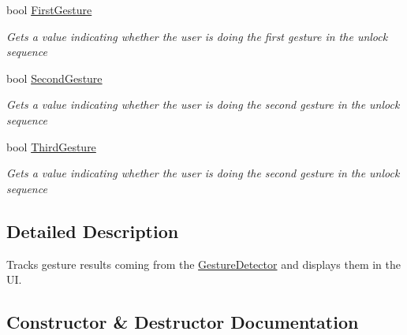 \begin{DoxyCompactItemize}
bool \hyperlink{class_microsoft_1_1_samples_1_1_kinect_1_1_kinect_security_system_1_1_gesture_result_view_a17c6d227a701ffeebc95d6917321e7e4}{First\+Gesture}
\begin{DoxyCompactList}\small\item\em Gets a value indicating whether the user is doing the first gesture in the unlock sequence \end{DoxyCompactList}\item 
bool \hyperlink{class_microsoft_1_1_samples_1_1_kinect_1_1_kinect_security_system_1_1_gesture_result_view_aaad4853761b6ec0a9ce02ed7eea5d41c}{Second\+Gesture}
\begin{DoxyCompactList}\small\item\em Gets a value indicating whether the user is doing the second gesture in the unlock sequence \end{DoxyCompactList}\item 
bool \hyperlink{class_microsoft_1_1_samples_1_1_kinect_1_1_kinect_security_system_1_1_gesture_result_view_a4e85797de3a76eeaa858a9c07bf69f7f}{Third\+Gesture}
\begin{DoxyCompactList}\small\item\em Gets a value indicating whether the user is doing the second gesture in the unlock sequence \end{DoxyCompactList}\end{DoxyCompactItemize}


\subsection{Detailed Description}
Tracks gesture results coming from the \hyperlink{class_microsoft_1_1_samples_1_1_kinect_1_1_kinect_security_system_1_1_gesture_detector}{Gesture\+Detector} and displays them in the UI. 



\subsection{Constructor \& Destructor Documentation}
\mbox{\label{class_microsoft_1_1_samples_1_1_kinect_1_1_kinect_security_system_1_1_gesture_result_view_a577bb3cc591276f7128384ca55746126}} 
